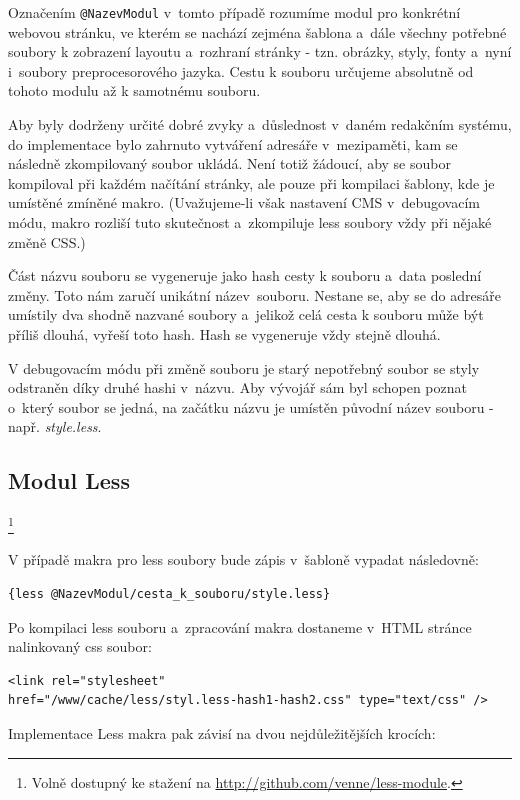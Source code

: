\documentclass[thesis=B,czech]{FITthesis}[2012/06/26]
\begin{document}
Označením \verb#@NazevModul# v~tomto případě rozumíme modul pro konkrétní webovou stránku, ve kterém se nachází zejména  šablona a~dále všechny potřebné soubory k zobrazení layoutu a~rozhraní stránky - tzn. obrázky, styly, fonty a~nyní i~soubory preprocesorového jazyka. Cestu k souboru určujeme absolutně od tohoto modulu až k samotnému souboru.

Aby byly dodrženy určité dobré zvyky a~důslednost v~daném redakčním systému, do implementace bylo zahrnuto vytváření adresáře v~mezipaměti, kam se následně zkompilovaný soubor ukládá. Není totiž žádoucí, aby se soubor kompiloval při každém načítání stránky, ale pouze při kompilaci šablony, kde je umístěné zmíněné makro. (Uvažujeme-li však nastavení CMS v~debugovacím módu, makro rozliší tuto skutečnost a~zkompiluje less soubory vždy při nějaké změně CSS.)  

Část názvu souboru se vygeneruje jako hash cesty k souboru a~data poslední změny. Toto nám zaručí unikátní název~souboru. Nestane se, aby se do adresáře umístily dva shodně nazvané soubory a~jelikož celá cesta k souboru může být příliš dlouhá, vyřeší toto hash. Hash se vygeneruje vždy stejně dlouhá.

V debugovacím módu při změně souboru je starý nepotřebný soubor se styly odstraněn díky druhé hashi v~názvu. Aby vývojář sám byl schopen poznat o~který soubor se jedná, na začátku názvu je umístěn původní název souboru - např. \textit{style.less}.



\subsection{Modul Less}\footnote{Volně dostupný ke stažení na \url{http://github.com/venne/less-module}.}

V případě makra pro less soubory bude zápis v~šabloně vypadat následovně:
\scriptsize
\begin{verbatim}
{less @NazevModul/cesta_k_souboru/style.less}
\end{verbatim}
\normalsize
Po kompilaci less souboru a~zpracování makra dostaneme v~HTML stránce nalinkovaný css soubor:
\scriptsize
\begin{verbatim}
<link rel="stylesheet"
href="/www/cache/less/styl.less-hash1-hash2.css" type="text/css" />
\end{verbatim}
\normalsize
Implementace Less makra pak závisí na dvou nejdůležitějších krocích:
\end{document}
